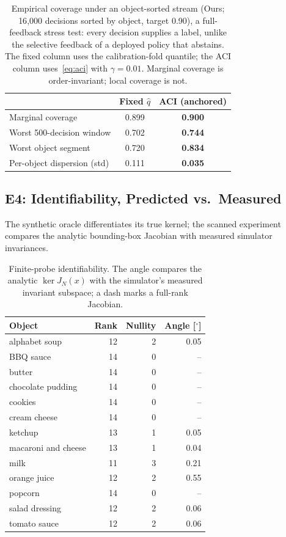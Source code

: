 \documentclass[letterpaper, 10pt, conference]{ieeeconf}
\begin{document}
\begin{table}[t]
\centering
\caption{Empirical coverage under an object-sorted stream (Ours; 16{,}000
decisions sorted by object, target 0.90), a full-feedback stress test:
every decision supplies a label, unlike the selective feedback of a deployed
policy that abstains. The fixed column uses the calibration-fold quantile; the
ACI column uses~\eqref{eq:aci} with $\gamma=0.01$. Marginal coverage is
order-invariant; local coverage is not.}
\label{tab:drift}
\begin{tabular}{lcc}
\toprule
 & Fixed $\hat q$ & ACI (anchored) \\
\midrule
Marginal coverage & 0.899 & \textbf{0.900} \\
Worst 500-decision window & 0.702 & \textbf{0.744} \\
Worst object segment & 0.720 & \textbf{0.834} \\
Per-object dispersion (std) & 0.111 & \textbf{0.035} \\
\bottomrule
\end{tabular}
\end{table}

\subsection{E4: Identifiability, Predicted vs.\ Measured}
\label{sec:ident-results}
The synthetic oracle differentiates its true kernel; the scanned experiment
compares the analytic bounding-box Jacobian with measured simulator
invariances.

\begin{table}[t]
\centering
\caption{Finite-probe identifiability. The angle compares the analytic
$\ker J_N(x)$ with the simulator's measured invariant subspace; a dash marks
a full-rank Jacobian.}
\label{tab:ident}
\footnotesize
\begin{tabular}{lrrr}
\toprule
Object & Rank & Nullity & Angle [$^\circ$] \\
\midrule
alphabet soup & 12 & 2 & 0.05 \\
BBQ sauce & 14 & 0 & -- \\
butter & 14 & 0 & -- \\
chocolate pudding & 14 & 0 & -- \\
cookies & 14 & 0 & -- \\
cream cheese & 14 & 0 & -- \\
ketchup & 13 & 1 & 0.05 \\
macaroni and cheese & 13 & 1 & 0.04 \\
milk & 11 & 3 & 0.21 \\
orange juice & 12 & 2 & 0.55 \\
popcorn & 14 & 0 & -- \\
salad dressing & 12 & 2 & 0.06 \\
tomato sauce & 12 & 2 & 0.06 \\
\bottomrule
\end{tabular}
\end{table}
\end{document}
